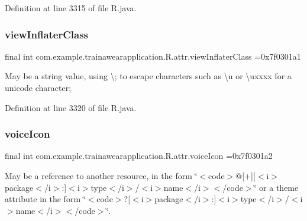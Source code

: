 Definition at line 3315 of file R.\+java.

\mbox{\label{classcom_1_1example_1_1trainawearapplication_1_1_r_1_1attr_ab29a9f9d52b04d35c24d624efe2897ef}} 
\subsubsection{\texorpdfstring{viewInflaterClass}{viewInflaterClass}}
{\footnotesize\ttfamily final int com.\+example.\+trainawearapplication.\+R.\+attr.\+view\+Inflater\+Class =0x7f0301a1\hspace{0.3cm}{\ttfamily [static]}}

May be a string value, using \textquotesingle{}\textbackslash{};\textquotesingle{} to escape characters such as \textquotesingle{}\textbackslash{}n\textquotesingle{} or \textquotesingle{}\textbackslash{}uxxxx\textquotesingle{} for a unicode character; 

Definition at line 3320 of file R.\+java.

\mbox{\label{classcom_1_1example_1_1trainawearapplication_1_1_r_1_1attr_a511371b0397ae0981b2bdd6ec8c36f09}} 
\subsubsection{\texorpdfstring{voiceIcon}{voiceIcon}}
{\footnotesize\ttfamily final int com.\+example.\+trainawearapplication.\+R.\+attr.\+voice\+Icon =0x7f0301a2\hspace{0.3cm}{\ttfamily [static]}}

May be a reference to another resource, in the form \char`\"{}$<$code$>$@\mbox{[}+\mbox{]}\mbox{[}$<$i$>$package$<$/i$>$\+:\mbox{]}$<$i$>$type$<$/i$>$/$<$i$>$name$<$/i$>$$<$/code$>$\char`\"{} or a theme attribute in the form \char`\"{}$<$code$>$?\mbox{[}$<$i$>$package$<$/i$>$\+:\mbox{]}$<$i$>$type$<$/i$>$/$<$i$>$name$<$/i$>$$<$/code$>$\char`\"{}. 

